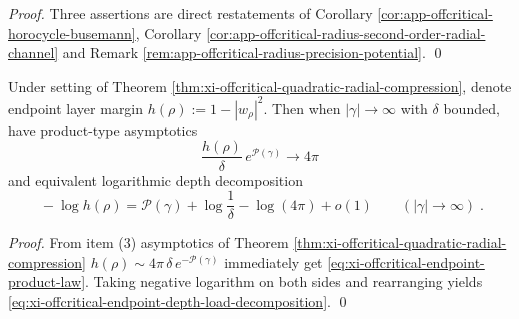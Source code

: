 \begin{proof}
Three assertions are direct restatements of Corollary \ref{cor:app-offcritical-horocycle-busemann}, Corollary \ref{cor:app-offcritical-radius-second-order-radial-channel} and Remark \ref{rem:app-offcritical-radius-precision-potential}. \qed
\end{proof}

\begin{corollary}\label{cor:xi-offcritical-endpoint-depth-log-decomposition}
Under setting of Theorem \ref{thm:xi-offcritical-quadratic-radial-compression}, denote endpoint layer margin
\(
h(\rho):=1-|w_\rho|^2
\).
Then when \(|\gamma|\to\infty\) with \(\delta\) bounded, have product-type asymptotics
\begin{equation}\label{eq:xi-offcritical-endpoint-product-law}
\boxed{\;
\frac{h(\rho)}{\delta}\,e^{\mathcal{P}(\gamma)}\to 4\pi\;}
\end{equation}
and equivalent logarithmic depth decomposition
\begin{equation}\label{eq:xi-offcritical-endpoint-depth-load-decomposition}
\boxed{\;
-\log h(\rho)=\mathcal{P}(\gamma)+\log\frac{1}{\delta}-\log(4\pi)+o(1)\qquad(|\gamma|\to\infty)\; }.
\end{equation}
\end{corollary}

\begin{proof}
From item (3) asymptotics of Theorem \ref{thm:xi-offcritical-quadratic-radial-compression}
\(
h(\rho)\sim 4\pi\,\delta\,e^{-\mathcal{P}(\gamma)}
\)
immediately get \eqref{eq:xi-offcritical-endpoint-product-law}.
Taking negative logarithm on both sides and rearranging yields \eqref{eq:xi-offcritical-endpoint-depth-load-decomposition}. \qed
\end{proof}

